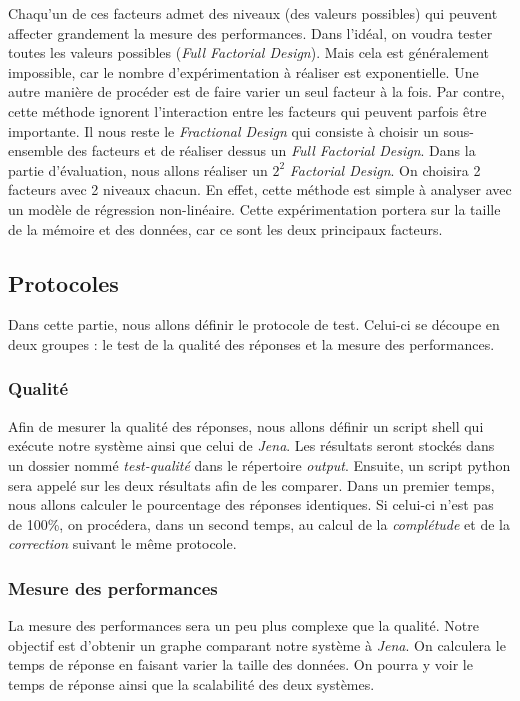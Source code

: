 \documentclass[12pt,titlepage]{article}
\begin{document}
Chaqu'un de ces facteurs admet des niveaux (des valeurs possibles) qui peuvent affecter grandement la mesure des performances. Dans l'idéal, on voudra tester toutes les valeurs possibles (\textit{Full Factorial Design}). Mais cela est généralement impossible, car le nombre d'expérimentation à réaliser est exponentielle. Une autre manière de procéder est de faire varier un seul facteur à la fois. Par contre, cette méthode ignorent l'interaction entre les facteurs qui peuvent parfois être importante. Il nous reste le \textit{Fractional Design} qui consiste à choisir un sous-ensemble des facteurs et de réaliser dessus un \textit{Full Factorial Design}. Dans la partie d'évaluation, nous allons réaliser un $2^2$ \textit{Factorial Design}. On choisira 2 facteurs avec 2 niveaux chacun. En effet, cette méthode est simple à analyser avec un modèle de régression non-linéaire. Cette expérimentation portera sur la taille de la mémoire et des données, car ce sont les deux principaux facteurs.

\subsection{Protocoles}

Dans cette partie, nous allons définir le protocole de test. Celui-ci se découpe en deux groupes : le test de la qualité des réponses et la mesure des performances.

\subsubsection{Qualité}

Afin de mesurer la qualité des réponses, nous allons définir un script shell qui exécute notre système ainsi que celui de \textit{Jena}. Les résultats seront stockés dans un dossier nommé \textit{test-qualité} dans le répertoire \textit{output}. Ensuite, un script python sera appelé sur les deux résultats afin de les comparer. Dans un premier temps, nous allons calculer le pourcentage des réponses identiques. Si celui-ci n'est pas de 100\%, on procédera, dans un second temps, au calcul de la \textit{complétude} et de la \textit{correction} suivant le même protocole.

\subsubsection{Mesure des performances}

La mesure des performances sera un peu plus complexe que la qualité. Notre objectif est d'obtenir un graphe comparant notre système à \textit{Jena}. On calculera le temps de réponse en faisant varier la taille des données. On pourra y voir le temps de réponse ainsi que la scalabilité des deux systèmes.
\end{document}
